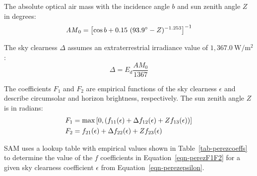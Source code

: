 \documentclass[12pt,letterpaper]{article}
\begin{document}
The absolute optical air mass with the incidence angle $b$ and sun zenith angle $Z$ in degrees:
\begin{equation}\label{eqn-perezam}
\mathit{AM}_0 = \left[ \cos b + 0.15~( 93.9\degree - Z )^{-1.253} \right]^{-1}
\end{equation}

The sky clearness $\Delta$ assumes an extraterrestrial irradiance value of $1,367.0~\mathrm{W/m^2}$:
\begin{equation}
\Delta = E_d \frac{\mathit{AM}_0}{1367}
\end{equation}

The coefficients $F_1$ and $F_2$ are empirical functions of the sky clearness $\epsilon$ and describe circumsolar and horizon brightness, respectively. The sun zenith angle $Z$ is in radians:
\begin{align}\label{eqn-perezF1F2}
F_1 & = \max \left[ 0,  \left( f_{\mathrm{11}}(\epsilon) + \Delta f_{\mathrm{12}}(\epsilon) + Z f_{\mathrm{13}}(\epsilon) \right) \right ] \notag\\
F_2 &= f_{\mathrm{21}}(\epsilon) + \Delta f_{\mathrm{22}}(\epsilon) + Z f_{\mathrm{23}}(\epsilon)
\end{align}

SAM uses a lookup table with empirical values shown in Table~\ref{tab-perezcoeffs} to determine the value of the $f$ coefficients in Equation~\ref{eqn-perezF1F2} for a given sky clearness coefficient $\epsilon$ from Equation~\ref{eqn-perezepsilon}.
\end{document}
